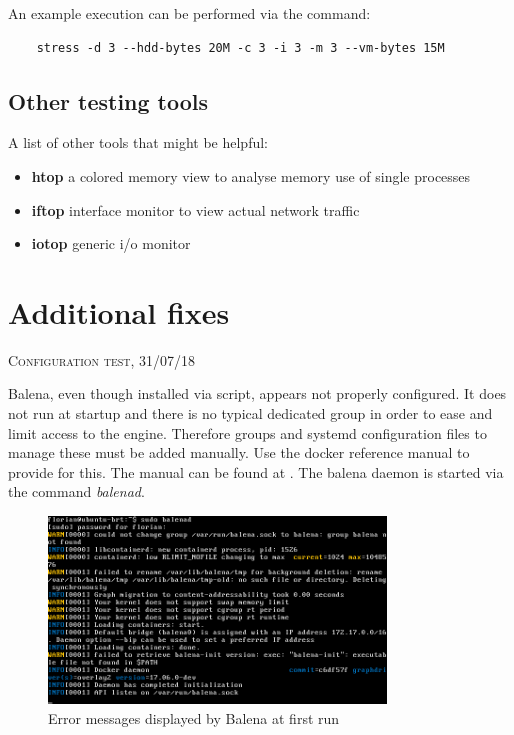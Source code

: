 \documentclass[]{scrartcl}
\begin{document}
An example execution can be performed via the command:

\begin{verbatim}
	stress -d 3 --hdd-bytes 20M -c 3 -i 3 -m 3 --vm-bytes 15M
\end{verbatim}

\subsection{Other testing tools}

A list of other tools that might be helpful:

\begin{itemize}
	\item \textbf{htop} a colored memory view to analyse memory use of single processes
	\item \textbf{iftop} interface monitor to view actual network traffic
	\item \textbf{iotop} generic i/o monitor
\end{itemize}

\section{Additional fixes}
{\small\textsc{Configuration test, 31/07/18} \bigskip}

Balena, even though installed via script, appears not properly configured. It does not run at startup and there is no typical dedicated group in order to ease and limit access to the engine.
Therefore groups and systemd configuration files to manage these must be added manually. Use the docker reference manual to provide for this. The manual can be found at \cite{docker02}. The balena daemon is started via the command \textit{balenad}.

\begin{figure}[t]
	\centering
	\includegraphics[width=0.8\textwidth]{balena-err}
	\caption{Error messages displayed by Balena at first run}
	\label{fig:balenad}
\end{figure}
\end{document}
